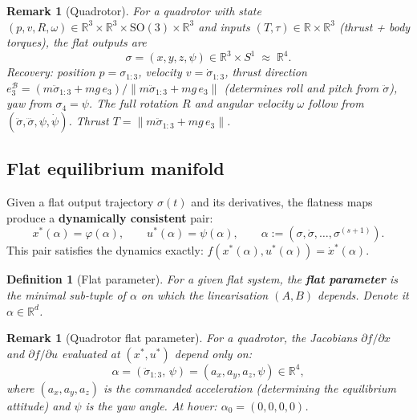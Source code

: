 \documentclass[11pt]{article}
\newtheorem{definition}[theorem]{Definition}
\newtheorem{remark}[theorem]{Remark}
\newcommand{\R}{\mathbb{R}}
\newcommand{\SO}{\mathrm{SO}}
\newcommand{\norm}[1]{\|#1\|}
\begin{document}
\begin{remark}[Quadrotor]
For a quadrotor with state
$(p, v, R, \omega) \in \R^3 \times \R^3 \times \SO(3)
\times \R^3$
and inputs $(T, \tau) \in \R \times \R^3$
(thrust + body torques),
the flat outputs are
\begin{equation}\label{eq:flat-quad}
  \sigma = (x, y, z, \psi) \in \R^3 \times S^1
  \;\approx\; \R^4.
\end{equation}
Recovery:
position $p = \sigma_{1:3}$,
velocity $v = \dot\sigma_{1:3}$,
thrust direction
$e_3^{\mathcal{B}} = (m\ddot\sigma_{1:3} + mg\,e_3)/
\norm{m\ddot\sigma_{1:3} + mg\,e_3}$
(determines roll and pitch from $\ddot\sigma$),
yaw from $\sigma_4 = \psi$.
The full rotation $R$ and angular velocity $\omega$
follow from $(\ddot\sigma, \dddot\sigma, \psi, \dot\psi)$.
Thrust $T = \norm{m\ddot\sigma_{1:3} + mg\,e_3}$.
\end{remark}

\subsection{Flat equilibrium manifold}

Given a flat output trajectory
$\sigma(t)$ and its derivatives,
the flatness maps produce a
\textbf{dynamically consistent} pair:
\begin{equation}\label{eq:flat-eq}
  x^*(\alpha) = \varphi(\alpha),
  \qquad
  u^*(\alpha) = \psi(\alpha),
  \qquad
  \alpha := (\sigma, \dot\sigma, \ldots, \sigma^{(s+1)}).
\end{equation}
This pair satisfies the dynamics exactly:
$f(x^*(\alpha), u^*(\alpha)) = \dot x^*(\alpha)$.

\begin{definition}[Flat parameter]\label{def:flat-param}
For a given flat system,
the \textbf{flat parameter} is the minimal
sub-tuple of $\alpha$ on which the
linearisation $(A, B)$ depends.
Denote it $\alpha \in \R^d$.
\end{definition}

\begin{remark}[Quadrotor flat parameter]\label{rem:quad-param}
For a quadrotor, the Jacobians
$\partial f/\partial x$ and $\partial f/\partial u$
evaluated at $(x^*, u^*)$ depend only on:
\begin{equation}\label{eq:quad-alpha}
  \alpha = (\ddot\sigma_{1:3},\, \psi)
  = (a_x, a_y, a_z, \psi) \in \R^4,
\end{equation}
where $(a_x, a_y, a_z)$ is the commanded acceleration
(determining the equilibrium attitude)
and $\psi$ is the yaw angle.
At hover: $\alpha_0 = (0, 0, 0, 0)$.
\end{remark}
\end{document}
